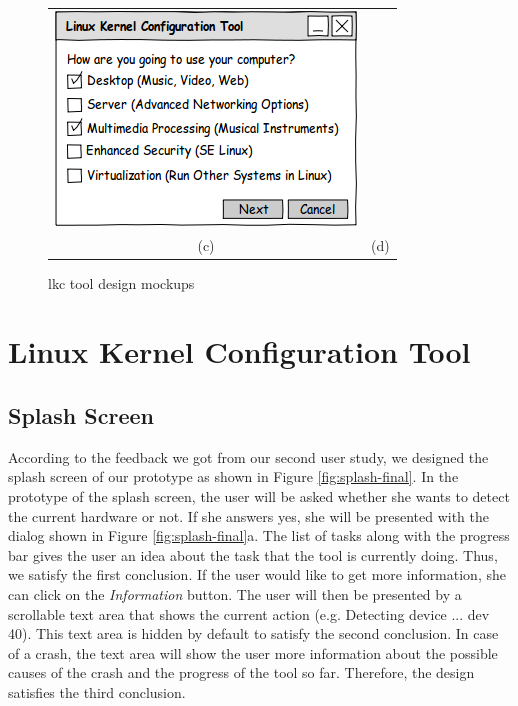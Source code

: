 \documentclass{chi2009}
\begin{document}
\begin{figure}[!t]
\begin{tabular}{SS}
 \includegraphics[scale=0.5,keepaspectratio=true]{figs/lkc-wizard} \\
 (c) & (d) \\
\end{tabular}
\caption{\textsf{lkc} tool design mockups}
\label{fig:lkc-tool}
\end{figure}

\section{Linux Kernel Configuration Tool}\label{sec:lkc}

\subsection{Splash Screen}
According to the feedback we got from our second user study, we designed the splash screen of our prototype as shown in Figure \ref{fig:splash-final}. In the
prototype of the splash screen, the user will be asked whether she wants to detect the current hardware or not. If she answers yes, she will be presented with
the dialog shown in Figure \ref{fig:splash-final}a. The list of tasks along with the progress bar gives the user an idea about the task that the tool is
currently doing. Thus, we satisfy the first conclusion. If the user would like to get more information, she can click on the \textit{Information} button. The
user will then be presented by a scrollable text area that shows the current action (e.g. Detecting device ... dev 40). This text area is hidden by default to
satisfy the second conclusion. In case of a crash, the text area will show the user more information about the possible causes of the crash and the progress of
the tool so far. Therefore, the design satisfies the third conclusion.
\end{document}
